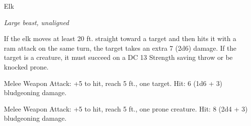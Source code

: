 \begin{monsterbox}{Elk}
\begin{hangingpar}
\textit{Large beast, unaligned}
\end{hangingpar}
\dndline%
\basics[%
armorclass = 10,
hitpoints = 2d10 + 2,
speed = {50 ft.}
]
\dndline%
\stats[%
STR = \stat{16},
DEX = \stat{10},
CON = \stat{12},
INT = \stat{2},
WIS = \stat{10},
CHA = \stat{6}
]
\dndline%
\details[%
skills={},
damageimmunities={},
savingthrows={},
conditionimmunities={},
damageresistances={},
damagevulnerabilities={},
senses={passive Perception 10},
challenge=1/4
]
\dndline%
\begin{monsteraction}[Charge]
If the elk moves at least 20 ft. straight toward a target and then hits it with a ram attack on the same turn, the target takes an extra 7 (2d6) damage. If the target is a creature, it must succeed on a DC 13 Strength saving throw or be knocked prone.
\end{monsteraction}
\begin{monsteraction}[Ram]
Melee Weapon Attack: +5 to hit, reach 5 ft., one target. Hit: 6 (1d6 + 3) bludgeoning damage.
\end{monsteraction}
\begin{monsteraction}[Hooves]
Melee Weapon Attack: +5 to hit, reach 5 ft., one prone creature. Hit: 8 (2d4 + 3) bludgeoning damage.
\end{monsteraction}
\end{monsterbox}